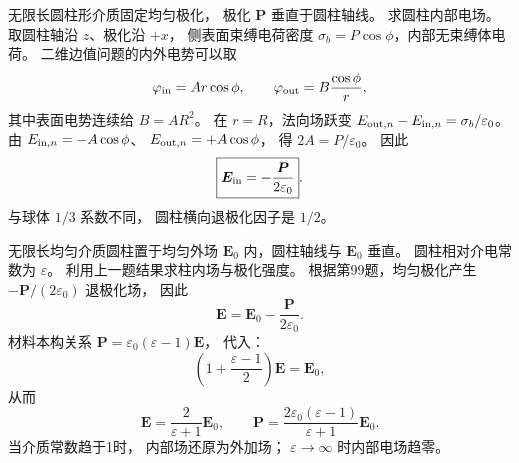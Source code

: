 无限长圆柱形介质固定均匀极化，
极化 $\bm P$ 垂直于圆柱轴线。
求圆柱内部电场。
\exsolution
取圆柱轴沿 $z$、极化沿 $+x$，
侧表面束缚电荷密度
$\sigma_b=P\cos\phi$，内部无束缚体电荷。
二维边值问题的内外电势可以取
\[
\varphi_{\rm in}=Ar\cos\phi,\qquad
\varphi_{\rm out}=B\frac{\cos\phi}{r},
\]
其中表面电势连续给 $B=AR^2$。
在 $r=R$，法向场跃变
$E_{{\rm out},n}-E_{{\rm in},n}=
\sigma_b/\varepsilon_0$。
由
$E_{{\rm in},n}=-A\cos\phi$、
$E_{{\rm out},n}=+A\cos\phi$，
得 $2A=P/\varepsilon_0$。
因此
\[
\boxed{\bm E_{\rm in}=
-\frac{\bm P}{2\varepsilon_0}}.
\]
\excheck 与球体 $1/3$ 系数不同，
圆柱横向退极化因子是 $1/2$。

无限长均匀介质圆柱置于均匀外场
$\bm E_0$ 内，圆柱轴线与 $\bm E_0$ 垂直。
圆柱相对介电常数为 $\varepsilon$。
利用上一题结果求柱内场与极化强度。
\exsolution
根据第99题，均匀极化产生
$-\bm P/(2\varepsilon_0)$ 退极化场，
因此
\[
\bm E=\bm E_0-\frac{\bm P}{2\varepsilon_0}.
\]
材料本构关系
$\bm P=\varepsilon_0(\varepsilon-1)\bm E$，
代入：
\[
\left(1+\frac{\varepsilon-1}{2}\right)\bm E
=\bm E_0,
\]
从而
\[
\boxed{\bm E=
\frac2{\varepsilon+1}\bm E_0},
\qquad
\boxed{\bm P=
\frac{2\varepsilon_0(\varepsilon-1)}
{\varepsilon+1}\bm E_0}.
\]
\excheck 当介质常数趋于1时，
内部场还原为外加场；
$\varepsilon\to\infty$ 时内部电场趋零。
